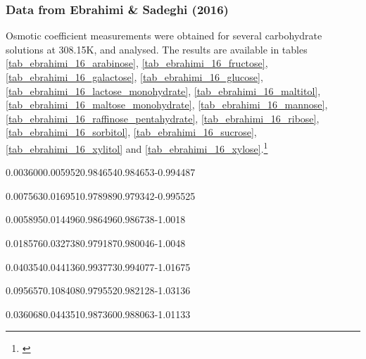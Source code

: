 \FloatBarrier

\subsubsection{Data from Ebrahimi \& Sadeghi (2016)}

Osmotic coefficient measurements were obtained for several carbohydrate solutions
at 308.15K, and analysed. The results are available in tables
\ref{tab_ebrahimi_16_arabinose},
\ref{tab_ebrahimi_16_fructose}, \ref{tab_ebrahimi_16_galactose},
\ref{tab_ebrahimi_16_glucose}, \ref{tab_ebrahimi_16_lactose_monohydrate},
\ref{tab_ebrahimi_16_maltitol}, \ref{tab_ebrahimi_16_maltose_monohydrate},
\ref{tab_ebrahimi_16_mannose}, \ref{tab_ebrahimi_16_raffinose_pentahydrate},
\ref{tab_ebrahimi_16_ribose}, \ref{tab_ebrahimi_16_sorbitol},
\ref{tab_ebrahimi_16_sucrose}, \ref{tab_ebrahimi_16_xylitol} and
\ref{tab_ebrahimi_16_xylose}.\footnote{\cite{ebrahimi2016}}

%
	{0.003600}{0.005952}{0.984654}{0.984653}{-0.994487}

%
	{0.007563}{0.016951}{0.978989}{0.979342}{-0.995525}

%
	{0.005895}{0.014496}{0.986496}{0.986738}{-1.0018}

%
	{0.018576}{0.032738}{0.979187}{0.980046}{-1.0048}

%
	{0.040354}{0.044136}{0.993773}{0.994077}{-1.01675}

%
	{0.095657}{0.108408}{0.979552}{0.982128}{-1.03136}

%
	{0.036068}{0.044351}{0.987360}{0.988063}{-1.01133}

